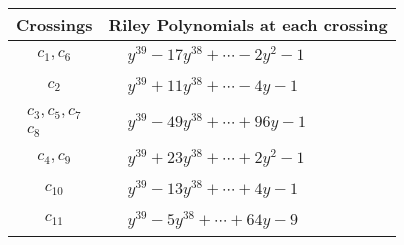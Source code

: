 \documentclass[1p]{elsarticle_modified}
\theoremstyle{definition}
\begin{document}
\begin{tabular}{m{50pt}|m{274pt}}
Crossings & \hspace{64pt}Riley Polynomials at each crossing \\
\hline $$\begin{aligned}c_{1},c_{6}\end{aligned}$$&$\begin{aligned}
&y^{39}-17 y^{38}+\cdots-2 y^2-1
\end{aligned}$\\
\hline $$\begin{aligned}c_{2}\end{aligned}$$&$\begin{aligned}
&y^{39}+11 y^{38}+\cdots-4 y-1
\end{aligned}$\\
\hline $$\begin{aligned}c_{3},c_{5},c_{7}\\c_{8}\end{aligned}$$&$\begin{aligned}
&y^{39}-49 y^{38}+\cdots+96 y-1
\end{aligned}$\\
\hline $$\begin{aligned}c_{4},c_{9}\end{aligned}$$&$\begin{aligned}
&y^{39}+23 y^{38}+\cdots+2 y^2-1
\end{aligned}$\\
\hline $$\begin{aligned}c_{10}\end{aligned}$$&$\begin{aligned}
&y^{39}-13 y^{38}+\cdots+4 y-1
\end{aligned}$\\
\hline $$\begin{aligned}c_{11}\end{aligned}$$&$\begin{aligned}
&y^{39}-5 y^{38}+\cdots+64 y-9
\end{aligned}$\\
\hline
\end{tabular}
\vskip 2pc
\end{document}
